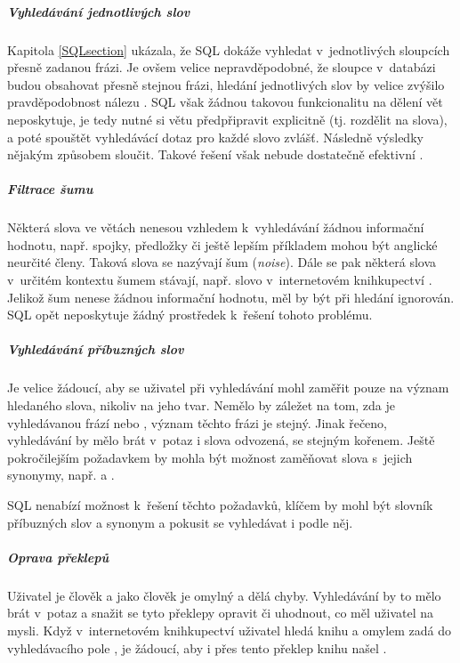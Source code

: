 \documentclass[11pt,oneside]{fithesis2}
\begin{document}
\subparagraph{Vyhledávání jednotlivých slov}
Kapitola \ref{SQLsection} ukázala, že SQL dokáže vyhledat v~jednotlivých sloupcích přesně zadanou frázi. Je ovšem velice nepravděpodobné, že sloupce v~databázi budou obsahovat přesně stejnou frázi, 
hledání jednotlivých slov by velice zvýšilo pravděpodobnost nálezu \cite[s.~9]{HibernateSearchAction}. SQL však žádnou takovou funkcionalitu na dělení vět neposkytuje, je tedy nutné si větu předpřipravit explicitně (tj. rozdělit na slova),
a poté spouštět vyhledávácí dotaz pro každé slovo zvlášť. Následně výsledky nějakým způsobem sloučit. Takové řešení však nebude dostatečně efektivní \cite[s.~10]{HibernateSearchAction}. 

\subparagraph{Filtrace šumu}
Některá slova ve větách nenesou vzhledem k~vyhledávání žádnou informační hodnotu, např. spojky, předložky či ještě lepším příkladem mohou být anglické neurčité členy. Taková slova se nazývají šum (\emph{noise}). Dále se pak některá slova v~určitém kontextu
šumem stávají, např. slovo  v~internetovém knihkupectví \cite[s.~9]{HibernateSearchAction}. Jelikož šum nenese žádnou informační hodnotu, měl by být při hledání ignorován. SQL opět neposkytuje žádný prostředek k~řešení tohoto problému.

\subparagraph{Vyhledávání příbuzných slov}
Je velice žádoucí, aby se uživatel při vyhledávání mohl zaměřit pouze na význam hledaného slova, nikoliv na jeho tvar. Nemělo by záležet na tom, zda je vyhledávanou frází  nebo , význam těchto frázi
je stejný. Jinak řečeno, vyhledávání by mělo brát v~potaz i slova odvozená, se stejným kořenem. Ještě pokročilejším požadavkem by mohla být možnost zaměňovat slova s~jejich synonymy, např.  a  \cite[s.~10]{HibernateSearchAction}.

SQL nenabízí možnost k~řešení těchto požadavků, klíčem by mohl být slovník příbuzných slov a synonym a pokusit se vyhledávat i podle něj. %

\subparagraph{Oprava překlepů}
Uživatel je člověk a jako člověk je omylný a dělá chyby. Vyhledávání by to mělo brát v~potaz a snažit se tyto překlepy opravit či uhodnout, co měl uživatel na mysli. Když v~internetovém knihkupectví uživatel hledá knihu  a
omylem zadá do vyhledávacího pole , je žádoucí, aby i přes tento překlep knihu našel \cite[s.~10]{HibernateSearchAction}.
\end{document}
